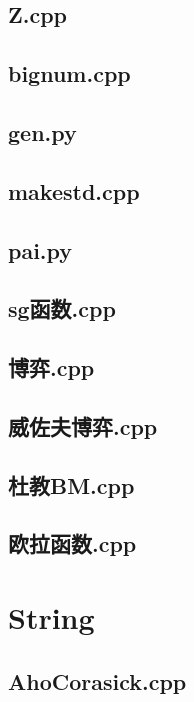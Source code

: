 \subsection{Z.cpp}

\subsection{bignum.cpp}

\subsection{gen.py}

\subsection{makestd.cpp}

\subsection{pai.py}

\subsection{sg函数.cpp}

\subsection{博弈.cpp}

\subsection{威佐夫博弈.cpp}

\subsection{杜教BM.cpp}

\subsection{欧拉函数.cpp}

\section{String}
\subsection{AhoCorasick.cpp}

